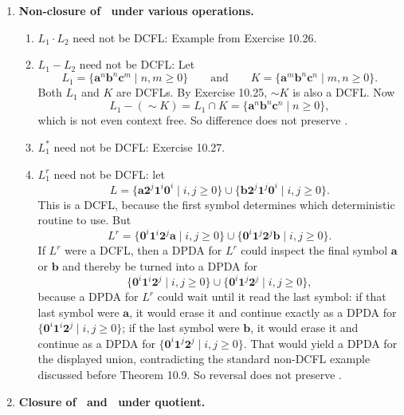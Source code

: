 \begin{enumerate}[{10.}1. ]
\item \textbf{Non-closure of \ASIG\ under various operations.}

\begin{enumerate}
\item $L_1\cdot L_2$ need not be DCFL: Example from Exercise 10.26.
\item $L_1 - L_2$ need not be DCFL: Let
\[
L_1=\{\pmb{a}^n\pmb{b}^n\pmb{c}^m\mid n,m\geq 0\}
\qquad\text{and}\qquad
K=\{\pmb{a}^m\pmb{b}^n\pmb{c}^n\mid m,n\geq 0\}.
\]
Both $L_1$ and $K$ are DCFLs. By Exercise 10.25, $\sim K$ is also a DCFL. Now
\[
L_1-(\sim K)=L_1\cap K=\{\pmb{a}^n\pmb{b}^n\pmb{c}^n\mid n\geq 0\},
\]
which is not even context free. So difference does not preserve \ASIG.
\item $L_1^*$ need not be DCFL: Exercise 10.27.
\item $L_1^r$ need not be DCFL: let
\[
L=\{\pmb{a}\pmb{2}^j\pmb{1}^i\pmb{0}^i\mid i,j\geq 0\}\cup
\{\pmb{b}\pmb{2}^j\pmb{1}^j\pmb{0}^i\mid i,j\geq 0\}.
\]
This is a DCFL, because the first symbol determines which deterministic routine to use. But
\[
L^r=\{\pmb{0}^i\pmb{1}^i\pmb{2}^j\pmb{a}\mid i,j\geq 0\}\cup
\{\pmb{0}^i\pmb{1}^j\pmb{2}^j\pmb{b}\mid i,j\geq 0\}.
\]
If $L^r$ were a DCFL, then a DPDA for $L^r$ could inspect the final symbol
$\pmb{a}$ or $\pmb{b}$ and thereby be turned into a DPDA for
\[
\{\pmb{0}^i\pmb{1}^i\pmb{2}^j\mid i,j\geq 0\}\cup
\{\pmb{0}^i\pmb{1}^j\pmb{2}^j\mid i,j\geq 0\},
\]
because a DPDA for $L^r$ could wait until it read the last symbol: if that last
symbol were $\pmb{a}$, it would erase it and continue exactly as a DPDA for
$\{\pmb{0}^i\pmb{1}^i\pmb{2}^j\mid i,j\geq 0\}$; if the last symbol were
$\pmb{b}$, it would erase it and continue as a DPDA for
$\{\pmb{0}^i\pmb{1}^j\pmb{2}^j\mid i,j\geq 0\}$. That would yield a DPDA for the
displayed union, contradicting the standard non-DCFL example discussed before
Theorem 10.9. So reversal does not preserve \ASIG.
\end{enumerate}

\item \textbf{Closure of \PSIG\ and \ASIG\ under quotient.}


\end{enumerate}
